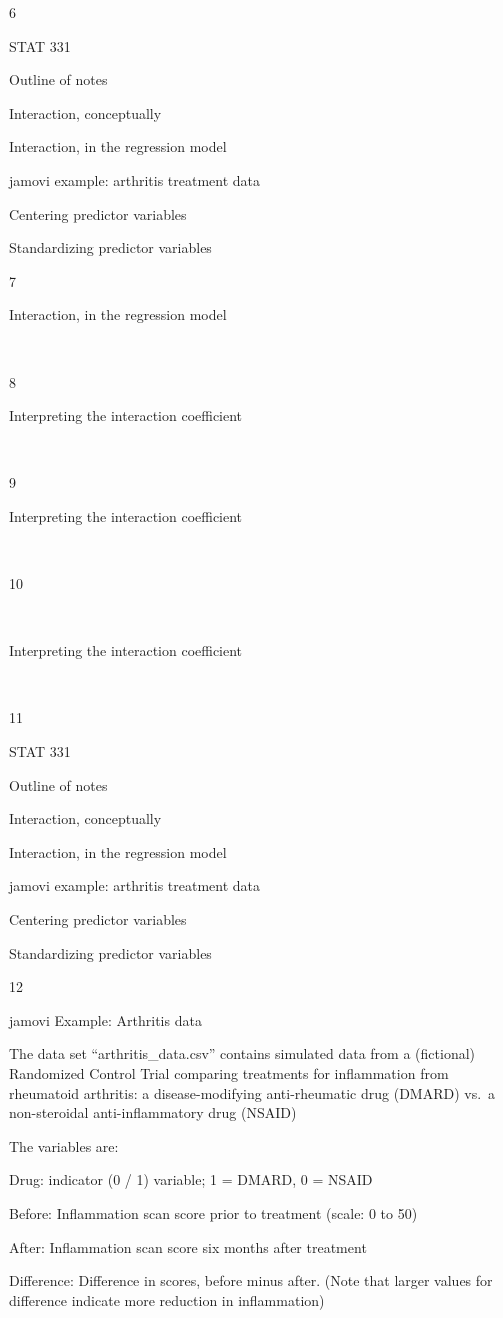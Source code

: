 \documentclass[
  letterpaper,
  DIV=11,
  numbers=noendperiod]{scrreprt}
\begin{document}
6

STAT 331

Outline of notes

Interaction, conceptually

Interaction, in the regression model

jamovi example: arthritis treatment data

Centering predictor variables

Standardizing predictor variables

7

Interaction, in the regression model

~

8

Interpreting the interaction coefficient

~

9

Interpreting the interaction coefficient

~

10

~

Interpreting the interaction coefficient

~

11

STAT 331

Outline of notes

Interaction, conceptually

Interaction, in the regression model

jamovi example: arthritis treatment data

Centering predictor variables

Standardizing predictor variables

12

jamovi Example: Arthritis data

The data set ``arthritis\_data.csv'' contains simulated data from a
(fictional) Randomized Control Trial comparing treatments for
inflammation from rheumatoid arthritis: a disease-modifying
anti-rheumatic drug (DMARD) vs.~a non-steroidal anti-inflammatory drug
(NSAID)

The variables are:

Drug: indicator (0 / 1) variable; 1 = DMARD, 0 = NSAID

Before: Inflammation scan score prior to treatment (scale: 0 to 50)

After: Inflammation scan score six months after treatment

Difference: Difference in scores, before minus after. (Note that larger
values for difference indicate more reduction in inflammation)
\end{document}
